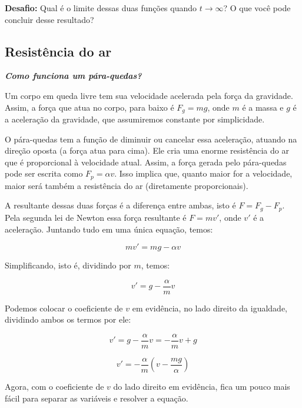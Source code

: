 \documentclass[a4paper]{article}
\begin{document}
{\bf Desafio:} Qual é o limite dessas duas funções quando
$t\rightarrow \infty$? O que você pode concluir desse resultado?

\subsection{Resistência do ar}

{\bf \em Como funciona um pára-quedas?}

Um corpo em queda livre tem sua velocidade acelerada pela força da
gravidade. Assim, a força que atua no corpo, para baixo é $F_g=mg$, onde
$m$ é a massa e $g$ é a aceleração da gravidade, que assumiremos
constante por simplicidade.

O pára-quedas tem a função de diminuir ou cancelar essa aceleração,
atuando na direção oposta (a força atua para cima). Ele cria uma
enorme resistência do ar que é {\rm proporcional} à velocidade
atual. Assim, a força gerada pelo pára-quedas pode ser escrita como
$F_p=\alpha v$. Isso implica que, quanto maior for a velocidade, maior
será também a resistência do ar (diretamente proporcionais).

A resultante dessas duas forças é a diferença entre ambas, isto é
$F=F_g-F_p$. Pela segunda lei de Newton essa força resultante é
$F=m v'$, onde $v'$ é a aceleração. Juntando tudo em uma única
equação, temos:

\begin{displaymath}
  m v' = mg - \alpha v
\end{displaymath}

Simplificando, isto é, dividindo por $m$, temos:

\begin{displaymath}
  v' = g - \frac{\alpha}{m} v
\end{displaymath}

Podemos colocar o coeficiente de $v$ em evidência, no lado direito da
igualdade, dividindo ambos os termos por ele:

\begin{displaymath}
  v' = g - \frac{\alpha}{m} v = - \frac{\alpha}{m} v +g
\end{displaymath}

\begin{displaymath}
  v' =  -\frac{\alpha}{m} ( v - \frac{mg}{\alpha})
\end{displaymath}

Agora, com o coeficiente de $v$ do lado direito em evidência, fica um
pouco mais fácil para separar as variáveis e resolver a equação.
\end{document}
